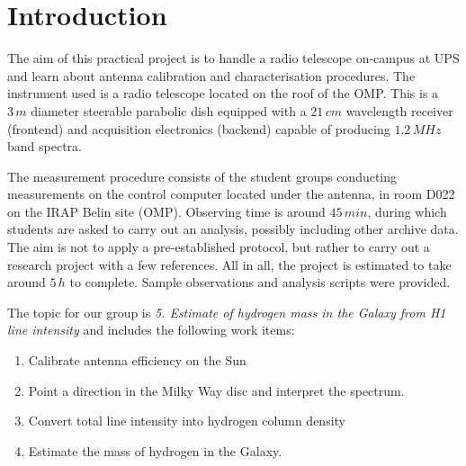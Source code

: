 \section{Introduction}
\label{sec:cntroduction}

The aim of this practical project is to handle a radio telescope on-campus at \ac{UPS} and learn about antenna calibration and characterisation procedures. 
The instrument used is a radio telescope located on the roof of the \ac{OMP}. 
This is a $3\,m$ diameter steerable parabolic dish equipped with a $21\,cm$ wavelength receiver (frontend) and acquisition electronics (backend) capable of producing $1.2 \,MHz$ band spectra.

The measurement procedure consists of the student groups conducting measurements on the control computer located under the antenna, in room D022 on the \ac{IRAP} Belin site (\ac{OMP}). 
Observing time is around $45\,min$, during which students are asked to carry out an analysis, possibly including other archive data.
The aim is not to apply a pre-established protocol, but rather to carry out a research project with a few references.
All in all, the project is estimated to take around $5\,h$ to complete.
Sample observations and analysis scripts were provided.

The topic for our group is \textit{5. Estimate of hydrogen mass in the Galaxy from H1 line intensity} and includes the following work items:
\begin{enumerate}
    \item Calibrate antenna efficiency on the Sun 
    \item Point a direction in the Milky Way disc and interpret the spectrum.
    \item Convert total line intensity into hydrogen column density
    \item Estimate the mass of hydrogen in the Galaxy.
\end{enumerate}

